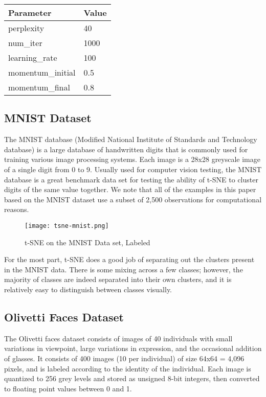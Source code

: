 \documentclass{article}
\begin{document}
\begin{center}
\begin{tabular}{ |p{4cm}||p{1cm}|  }
 \hline
 Parameter & Value \\
 \hline
 perplexity & 40 \\
 num\_iter & 1000 \\
 learning\_rate & 100 \\
 momentum\_initial & 0.5 \\
 momentum\_final & 0.8 \\
 \hline
\end{tabular}
\end{center}

\newpage
\subsection*{MNIST Dataset}

The MNIST database (Modified National Institute of Standards and Technology database) is a large database of handwritten digits that is commonly used for training various image processing systems. Each image is a 28x28 greyscale image of a single digit from 0 to 9. Usually used for computer vision testing, the MNIST database is a great benchmark data set for testing the ability of t-SNE to cluster digits of the same value together. We note that all of the examples in this paper based on the MNIST dataset use a subset of 2,500 observations for computational reasons.

\begin{figure}[H]
\caption{t-SNE on the MNIST Data set, Labeled}
\centering
\texttt{[image: tsne-mnist.png]}
\end{figure}

For the most part, t-SNE does a good job of separating out the clusters present in the MNIST data. There is some mixing across a few classes; however, the majority of classes are indeed separated into their own clusters, and it is relatively easy to distinguish between classes visually.

\newpage
\subsection*{Olivetti Faces Dataset}

The Olivetti faces dataset consists of images of 40 individuals with small variations in viewpoint, large variations in expression, and the occasional addition of glasses. It consists of 400 images (10 per individual) of size 64x64 = 4,096 pixels, and is labeled according to the identity of the individual. Each image is quantized to 256 grey levels and stored as unsigned 8-bit integers, then converted to floating point values between 0 and 1.
\end{document}
